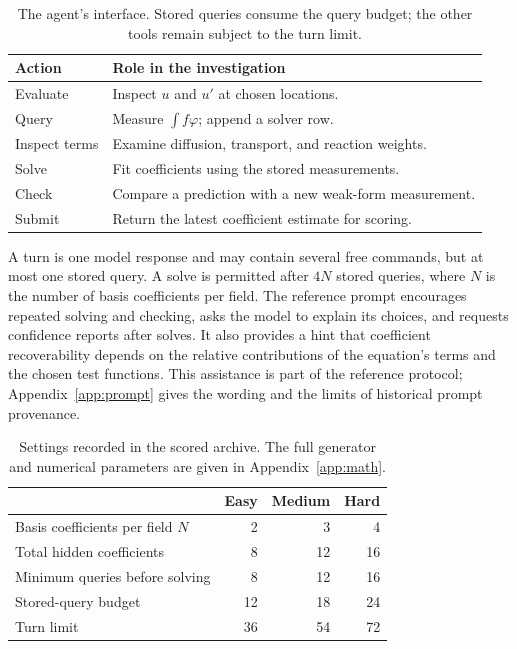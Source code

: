 \documentclass{article}
\begin{document}
\begin{table}[t]
\caption{The agent's interface. Stored queries consume the query budget;
the other tools remain subject to the turn limit.}
\label{tab:tools_main}
\centering\small
\begin{tabularx}{\columnwidth}{@{}lX@{}}
\toprule
Action & Role in the investigation\\
\midrule
Evaluate & Inspect \(u\) and \(u'\) at chosen locations.\\
Query & Measure \(\int f\varphi\); append a solver row.\\
Inspect terms & Examine diffusion, transport, and reaction weights.\\
Solve & Fit coefficients using the stored measurements.\\
Check & Compare a prediction with a new weak-form measurement.\\
Submit & Return the latest coefficient estimate for scoring.\\
\bottomrule
\end{tabularx}
\end{table}

A turn is one model response and may contain several free commands, but at most
one stored query. A solve is permitted after \(4N\) stored queries, where
\(N\) is the number of basis coefficients per field. The reference prompt encourages repeated solving and checking, asks the model
to explain its choices, and requests confidence reports after solves. It also
provides a hint that coefficient recoverability depends on the relative
contributions of the equation's terms and the chosen test functions. This
assistance is part of the reference protocol; Appendix~\ref{app:prompt} gives
the wording and the limits of historical prompt provenance.

\begin{table}[t]
\caption{Settings recorded in the scored archive. The full generator and
numerical parameters are given in Appendix~\ref{app:math}.}
\label{tab:task_main}
\centering\small
\begin{tabular}{@{}lrrr@{}}
\toprule
 & Easy & Medium & Hard\\
\midrule
Basis coefficients per field \(N\) & 2 & 3 & 4\\
Total hidden coefficients & 8 & 12 & 16\\
Minimum queries before solving & 8 & 12 & 16\\
Stored-query budget & 12 & 18 & 24\\
Turn limit & 36 & 54 & 72\\
\bottomrule
\end{tabular}
\end{table}
\end{document}
